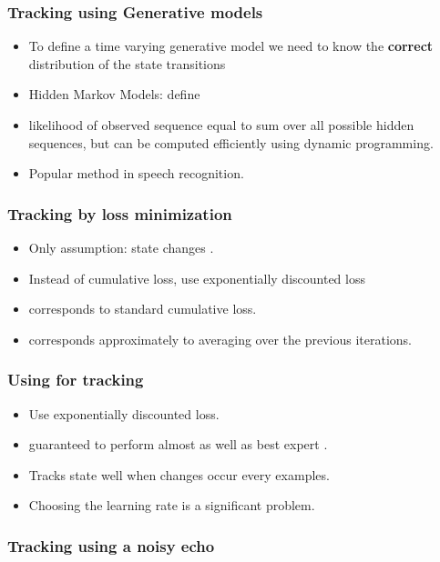 \documentclass{beamer}
\begin{document}
\begin{frame}
\frametitle{Tracking using Generative models}
\begin{itemize}
\item To define a time varying generative model we need to know the
  {\bf correct} distribution of the state transitions
\item Hidden Markov Models: define 
\item likelihood of observed sequence equal to sum over all possible
  hidden sequences, but can be computed efficiently using dynamic
  programming. 
\item Popular method in speech recognition.
\end{itemize}
\end{frame}

\begin{frame}
\frametitle{Tracking by loss minimization}
\begin{itemize}
\item Only assumption: state changes .
\item Instead of cumulative loss, use exponentially discounted loss
\item {} corresponds to standard cumulative loss.
\item {} corresponds approximately to averaging over the
  previous  iterations. 
\end{itemize}
\end{frame}

\begin{frame}
\frametitle{Using \ouralg for tracking}
\begin{itemize}
\item Use exponentially discounted loss.
\item \ouralg guaranteed to perform almost as well as best expert
  .
\item Tracks state well when changes occur every 
  examples.
\item Choosing the learning rate \redEq{\eta} is a significant problem.
\end{itemize}
\end{frame}

\iffalse
\begin{frame}
\frametitle{Tracking using a noisy echo}
\end{frame}
\end{document}

